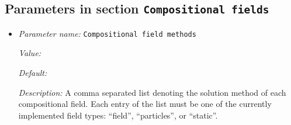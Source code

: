 \subsection{Parameters in section \tt Compositional fields}
\label{parameters:Compositional_20fields}

\begin{itemize}
\item {\it Parameter name:} {\tt Compositional field methods}
\label{parameters:Compositional fields/Compositional field methods}
\label{parameters:Compositional_20fields/Compositional_20field_20methods}


{\it Value:} 


{\it Default:} 


{\it Description:} A comma separated list denoting the solution method of each compositional field. Each entry of the list must be one of the currently implemented field types: ``field'', ``particles'', or ``static''.


\end{itemize}

